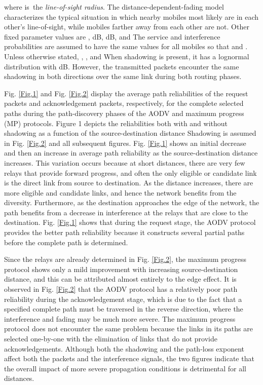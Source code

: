 \documentclass[conference]{IEEEtran}
\begin{document}
where  is\ the \emph{line-of-sight radius}. The
distance-dependent-fading model characterizes the typical situation in which
nearby mobiles most likely are in each other's line-of-sight, while mobiles
farther away from each other are not. Other fixed parameter values are
    ,  dB,
   dB, 
and  The service and interference probabilities
are assumed to have the same values for all mobiles
so that  and
. Unless otherwise stated, , ,  and  When
shadowing is present, it has a lognormal distribution with  dB.
However, the transmitted packets encounter the same shadowing in both directions over the same link during both routing phases.



Fig. \ref{Fig.1} and Fig. \ref{Fig.2} display the average path reliabilities of the request packets
and acknowledgement packets, respectively, for the complete selected paths
during the path-discovery phases of the AODV and maximum
progress (MP) protocols. Figure 1 depicts the reliabilities both with and without
shadowing as a function of the source-destination distance  Shadowing is
assumed in Fig. \ref{Fig.2} and all subsequent figures. Fig. \ref{Fig.1} shows an initial decrease and then an increase in average path reliability as the source-destination distance
increases. This variation occurs because at short distances, there are very few relays that provide forward
progress, and often the only eligible or candidate link
is the direct link from source to destination. As the
distance increases, there are more eligible and candidate
links, and hence the network benefits from the diversity.
Furthermore, as the destination approaches the edge
of the network, the path benefits from a decrease in
interference at the relays that are close to the destination.
Fig. \ref{Fig.1} shows that during the request stage, the AODV
protocol provides the better path reliability because it
constructs several partial paths before the complete path
is determined.

Since the relays are already determined in Fig. \ref{Fig.2}, the
maximum progress protocol shows only a mild improvement with increasing source-destination distance, and
this can be attributed almost entirely to the edge effect. It
is observed in Fig. \ref{Fig.2} that the AODV protocol has a relatively poor path reliability during the acknowledgement
stage, which is due to the fact that a specified complete
path must be traversed in the reverse direction, where the
interference and fading may be much more severe. The
maximum progress protocol does not encounter the same
problem because the links in its paths are selected one-by-one with the elimination of links that do not provide
acknowledgements. Although both the shadowing and
the path-loss exponent  affect both the packets and
the interference signals, the two figures indicate that the
overall impact of more severe propagation conditions is
detrimental for all distances.
\end{document}
